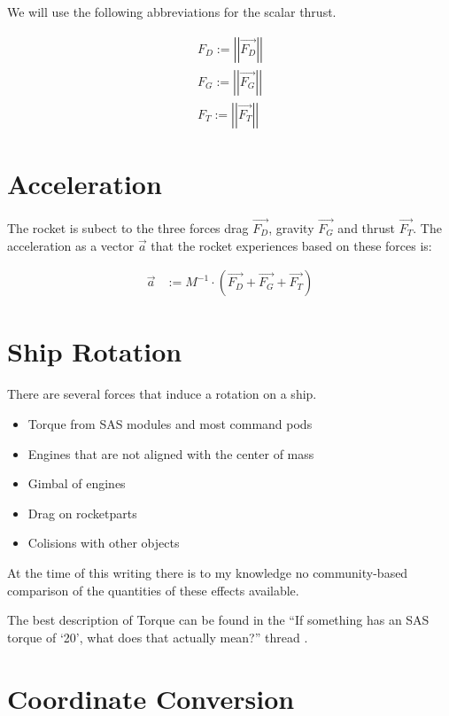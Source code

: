 \documentclass[11pt]{report}
\newcommand{\oa}[1]{\overrightarrow{#1}}
\newcommand{\F}[1]{\oa{F_{#1}}}
\newcommand{\absvec}[1]{\left|\left|{#1}\right|\right|}
\begin{document}
We will use the following abbreviations for the scalar thrust.

\begin{align}
  F_D := \absvec{\oa{F_D}}\nonumber\\
  F_G := \absvec{\oa{F_G}}\nonumber\\
  F_T := \absvec{\oa{F_T}}\nonumber
\end{align}

\chapter{Acceleration}

The rocket is subect to the three forces drag $\F{D}$, gravity $\F{G}$
and thrust $\F{T}$.  The  acceleration as a vector
$\oa{a}$ that the rocket experiences based on these forces is:

\begin{align}
  \oa{a} &:= M^{-1} \cdot(\F{D} + \F{G} + \F{T})
\end{align}

\chapter{Ship Rotation}

There are several forces that induce a rotation on a ship.

\begin{itemize}
\item {} Torque from SAS modules and most command pods
\item Engines that are not aligned with the center of mass
\item {} Gimbal of engines
\item Drag on rocketparts
\item Colisions with other objects
\end{itemize}

At the time of this writing there is to my knowledge no
community-based comparison of the quantities of these effects
available.

The best description of Torque can be found in the ``If something has
an SAS torque of `20', what does that actually mean?'' thread
\cite{torque}.

\chapter{Coordinate Conversion}
\end{document}
